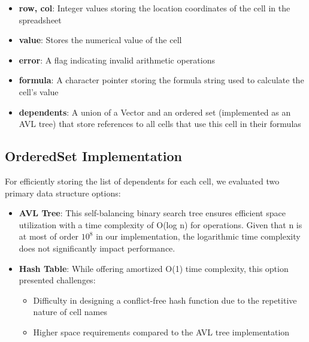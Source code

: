 \documentclass[10pt,a4paper]{article}  %
\begin{document}
\begin{itemize}
    \item \textbf{row, col}: Integer values storing the location coordinates of the cell in the spreadsheet
    \item \textbf{value}: Stores the numerical value of the cell
    \item \textbf{error}: A flag indicating invalid arithmetic operations 
    \item \textbf{formula}: A character pointer storing the formula string used to calculate the cell's value
    \item \textbf{dependents}: A union of a Vector and an ordered set (implemented as an AVL tree) that store references to all cells that use this cell in their formulas
    
\end{itemize}





\subsection{OrderedSet Implementation}
For efficiently storing the list of dependents for each cell, we evaluated two primary data structure options:

\begin{itemize}
    \item \textbf{AVL Tree}: This self-balancing binary search tree ensures efficient space utilization with a time complexity of O(log n) for operations. Given that n is at most of order $10^8$ in our implementation, the logarithmic time complexity does not significantly impact performance.
    
    \item \textbf{Hash Table}: While offering amortized O(1) time complexity, this option presented challenges:
    \begin{itemize}
        \item Difficulty in designing a conflict-free hash function due to the repetitive nature of cell names
        \item Higher space requirements compared to the AVL tree implementation
    \end{itemize}
\end{itemize}
\end{document}

